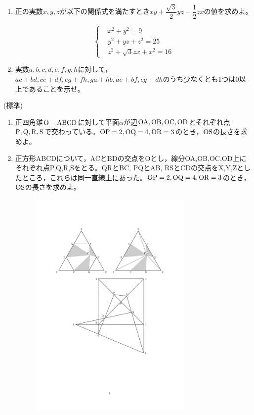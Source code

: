 \documentclass[a4paper,12pt,uplatex]{jsarticle}  %
\begin{document}
\begin{enumerate}
\item 正の実数$x, y, z$が以下の関係式を満たすとき$xy+\dfrac{\sqrt 3}{2}yz+\dfrac{1}{2}zx$の値を求めよ。

\begin{equation}
  \left\{
    \begin{alignedat}{1}
      &x^{2} + y^{2} =9 \\ 
      &y^{2} +yz+z^{2} = 25   \\
      &z^{2} + \sqrt{3}zx + x^{2} = 16  \nonumber
    \end{alignedat}
  \right.
\end{equation}


\item 実数$a,b,c,d,e,f,g,h$に対して，$ac+bd, ce+df, eg+fh, ga+hb, ae+bf, cg+dh$のうち少なくとも1つは0以上であることを示せ。
\end{enumerate}

\bigskip

 (標準)

\begin{enumerate}
\item 正四角錐$\rm O-ABCD$に対して平面$\alpha$が辺$\rm OA, OB, OC, OD$とそれぞれ点$\rm P, Q, R, S$で交わっている。$\rm OP=2, OQ=4, OR=3$のとき，$\rm OS$の長さを求めよ。
\item 正方形ABCDについて，ACとBDの交点をOとし，線分OA,OB,OC,OD上にそれぞれ点P,Q,R,Sをとる。QRとBC, PQとAB, RSとCDの交点をX,Y,Zとしたところ，これらは同一直線上にあった。$\rm OP=2, OQ=4, OR=3$のとき，$\rm OS$の長さを求めよ。

\begin{figure}[ht]
  \centering
  \includegraphics[width=8.0cm]{jizen_4_2_problem.pdf}
\end{figure}

\end{enumerate}
\end{document}

